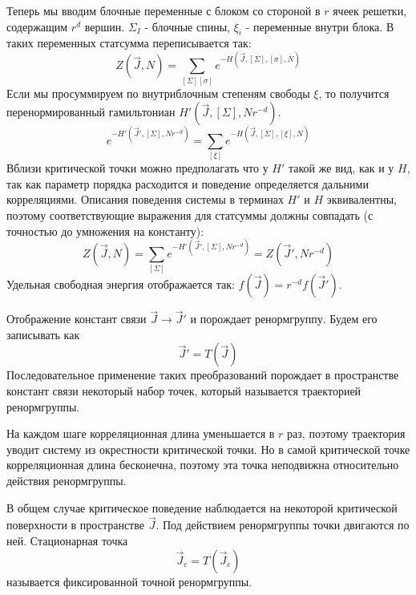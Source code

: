 \documentclass[a4paper,12pt]{article}
\theoremstyle{definition}
\theoremstyle{definition}
\theoremstyle{definition}
\begin{document}
Теперь мы вводим блочные переменные с блоком со стороной в $r$ ячеек решетки, содержащим $r^d$ вершин. $\Sigma_I$ - блочные спины, $\xi_i$ - переменные внутри блока. В таких переменных статсумма переписывается так:
\begin{equation}
  \label{eq:57}
  Z(\vec J,N)=\sum_{[\Sigma][\sigma]}e^{-H(\vec J,[\Sigma],[\sigma],N)}
\end{equation}
Если мы просуммируем по внутриблочным степеням свободы $\xi$, то получится перенормированный гамильтониан $H'(\vec J,[\Sigma],Nr^{-d})$.
\begin{equation}
  \label{eq:58}
  e^{-H'(\vec J',[\Sigma],Nr^{-d})}=\sum_{[\xi]}e^{-H(\vec J,[\Sigma],[\xi],N)}
\end{equation}
Вблизи критической точки можно предполагать что у $H'$ такой же вид, как и у $H$, так как параметр порядка расходится и поведение определяется дальними корреляциями. Описания поведения системы в терминах $H'$ и $H$ эквивалентны, поэтому соответствующие выражения для статсуммы должны совпадать (с точностью до умножения на константу):
\begin{equation}
\label{eq:52}
  Z(\vec J,N)=\sum_{[\Sigma]}e^{-H'(\vec J',[\Sigma],Nr^{-d})}=Z(\vec J',Nr^{-d})
\end{equation}
Удельная свободная энергия отображается так: $f(\vec J)=r^{-d} f(\vec J')$.

Отображение констант связи $\vec J\to\vec J'$ и порождает ренормгруппу. Будем его записывать как
\begin{equation}
  \label{eq:53}
  \vec J'=T(\vec J)
\end{equation}
Последовательное применение таких преобразований порождает в пространстве констант связи некоторый набор точек, который называется траекторией ренормгруппы.

На каждом шаге корреляционная длина уменьшается в $r$ раз, поэтому траектория уводит систему из окрестности критической точки. Но в самой критической точке корреляционная длина бесконечна, поэтому эта точка неподвижна относительно действия ренормгруппы. 

В общем случае критическое поведение наблюдается на некоторой критической поверхности в пространстве $\vec J$. Под действием ренормгруппы точки двигаются по ней. Стационарная точка
\begin{equation}
  \label{eq:54}
  \vec J_c=T(\vec J_c)
\end{equation}
называется фиксированной точной ренормгруппы.
\end{document}
